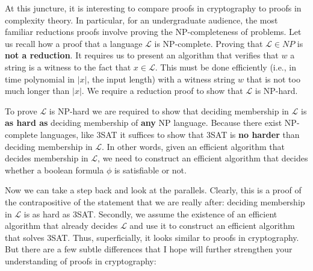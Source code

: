 \documentclass[A4, 11pt]{article}
\renewcommand{\L}{\ensuremath{\mathcal{L}}}
\begin{document}
\par
At this juncture, it is interesting to compare proofs in cryptography to
proofs in complexity theory. In particular, for an undergraduate audience,
the most familiar reductions proofs involve proving the NP-completeness of
problems. Let us recall how a proof that a language $\L$ is NP-complete.
Proving that $\L \in NP$ is {\bf not a reduction}. It requires us to
present an algorithm that verifies that $w$ a string is a witness to the
fact that $x \in \L$. This must be done efficiently (i.e., in time
polynomial in $|x|$, the input length) with a witness string $w$ that is
not too much longer than $|x|$. We require a reduction proof to show that
$\L$ is NP-hard.

To prove $\L$ is NP-hard we are required to show that deciding membership
in $\L$ is {\bf as hard as} deciding membership of {\bf any} NP language.
Because there exist NP-complete languages, like 3SAT it suffices to show
that 3SAT is {\bf no harder} than deciding membership in $\L$. In other
words, given an efficient algorithm that decides membership in $\L$, we
need to construct an efficient algorithm that decides whether a boolean
formula $\phi$ is satisfiable or not. 

\par
Now we can take a step back and look at the parallels. Clearly, this is a
proof of the contrapositive of the statement that we are really after:
deciding membership in $\L$ is as hard as 3SAT. Secondly, we assume the
existence of an efficient algorithm that already decides $\L$ and use it to
construct an efficient algorithm that solves 3SAT. Thus, superficially, it
looks similar to proofs in cryptography. But there are a few subtle
differences that I hope will further strengthen your understanding of
proofs in cryptography:
\end{document}
